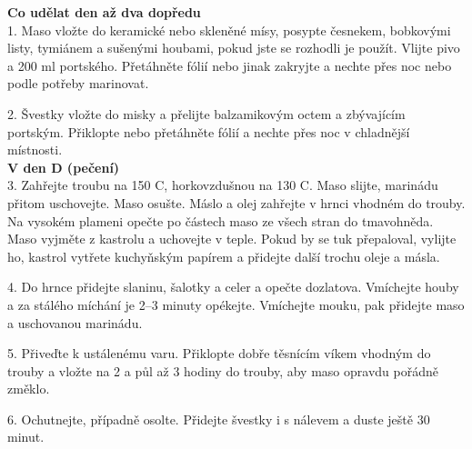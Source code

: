 \documentclass[10pt,a4paper]{article}
\begin{document}
\begin{minipage}[t]{0,5\textwidth}
\textbf{Co udělat den až dva dopředu}\\

1. Maso vložte do keramické nebo skleněné mísy, posypte česnekem, bobkovými listy, tymiánem a sušenými houbami, pokud jste se rozhodli je použít. Vlijte pivo a 200 ml portského. Přetáhněte fólií nebo jinak zakryjte a nechte přes noc nebo podle potřeby marinovat.

2. Švestky vložte do misky a přelijte balzamikovým octem a zbývajícím portským. Přiklopte nebo přetáhněte fólií a nechte přes noc v chladnější místnosti.\\

\textbf{V den D (pečení)}\\

3. Zahřejte troubu na 150 \degree C, horkovzdušnou na 130 \degree C. Maso slijte, marinádu přitom uschovejte. Maso osušte. Máslo a olej zahřejte v hrnci vhodném do trouby. Na vysokém plameni opečte po částech maso ze všech stran do tmavohněda. Maso vyjměte z kastrolu a uchovejte v teple. Pokud by se tuk přepaloval, vylijte ho, kastrol vytřete kuchyňským papírem a přidejte další trochu oleje a másla.

4. Do hrnce přidejte slaninu, šalotky a celer a opečte dozlatova. Vmíchejte houby a za stálého míchání je 2–3 minuty opékejte. Vmíchejte mouku, pak přidejte maso a uschovanou marinádu. 

5. Přiveďte k ustálenému varu. Přiklopte dobře těsnícím víkem vhodným do trouby a vložte na 2 a půl až 3 hodiny do trouby, aby maso opravdu pořádně změklo.

6. Ochutnejte, případně osolte. Přidejte švestky i s nálevem a duste ještě 30 minut.
\end{minipage}
\end{document}
